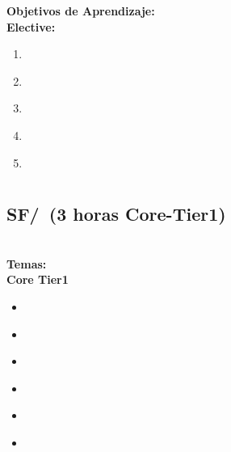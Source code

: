 \noindent \textbf{Objetivos de Aprendizaje:}\\
\noindent \textbf{Elective:}
\begin{enumerate}
	\setcounter{enumi}{0}
	\item \SEFormalMethodsLODescribeTheSpecification\xspace[\SEFormalMethodsLODescribeTheSpecificationLevel]\label{sec:BOK:SEFormalMethodsLODescribeTheSpecification}
	\item \SEFormalMethodsLOApplyFormalAnalysis\xspace[\SEFormalMethodsLOApplyFormalAnalysisLevel]\label{sec:BOK:SEFormalMethodsLOApplyFormalAnalysis}
	\item \SEFormalMethodsLOExplainTheAndUsing\xspace[\SEFormalMethodsLOExplainTheAndUsingLevel]\label{sec:BOK:SEFormalMethodsLOExplainTheAndUsing}
	\item \SEFormalMethodsLOCreateAndAssertions\xspace[\SEFormalMethodsLOCreateAndAssertionsLevel]\label{sec:BOK:SEFormalMethodsLOCreateAndAssertions}
	\item \SEFormalMethodsLOUsingA\xspace[\SEFormalMethodsLOUsingALevel]\label{sec:BOK:SEFormalMethodsLOUsingA}
\end{enumerate}




\section{\SF}\label{sec:BOK:SF}
\SFBOKDescription


\subsection{SF/\SFComputationalParadigms~(3 horas Core-Tier1)}\label{sec:BOK:SFComputationalParadigms}
\SFComputationalParadigmsDescription\\
\noindent \textbf{Temas:}\\
\noindent \textbf{Core Tier1}
\begin{itemize}
	\item \SFComputationalParadigmsTopicBasic\label{sec:BOK:SFComputationalParadigmsTopicBasic}
	\item \SFComputationalParadigmsTopicHardware\label{sec:BOK:SFComputationalParadigmsTopicHardware}
	\item \SFComputationalParadigmsTopicApplication\label{sec:BOK:SFComputationalParadigmsTopicApplication}
	\item \SFComputationalParadigmsTopicSimple\label{sec:BOK:SFComputationalParadigmsTopicSimple}
	\item \SFComputationalParadigmsTopicBasicConcept\label{sec:BOK:SFComputationalParadigmsTopicBasicConcept}
	\item \SFComputationalParadigmsTopicBasicConceptOf\label{sec:BOK:SFComputationalParadigmsTopicBasicConceptOf}
\end{itemize}


